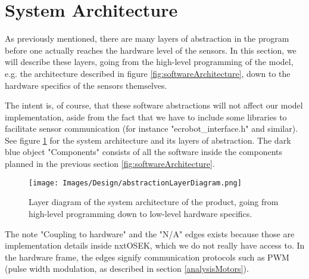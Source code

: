 \section{System Architecture}


As previously mentioned, there are many layers of abstraction in the program before one actually reaches the hardware level of the sensors. In this section, we will describe these layers, going from the high-level programming of the model, e.g. the architecture described in figure \ref{fig:softwareArchitecture}, down to the hardware specifics of the sensors themselves. 

The intent is, of course, that these software abstractions will not affect our model implementation, aside from the fact that we have to include some libraries to facilitate sensor communication (for instance "ecrobot\_interface.h" and similar). See figure \ref{fig:abstractionLayers} for the system architecture and its layers of abstraction. The dark blue object "Components" consists of all the software inside the components planned in the previous section \ref{fig:softwareArchitecture}. 

\begin{figure}[H]
    \texttt{[image: Images/Design/abstractionLayerDiagram.png]}
    \caption{Layer diagram of the system architecture of the product, going from high-level programming down to low-level hardware specifics.
    }
    \label{fig:abstractionLayers}
\end{figure}

The note "Coupling to hardware" and the "N/A" edges exists because those are implementation details inside nxtOSEK, which we do not really have access to. In the hardware frame, the edges signify communication protocols such as PWM (pulse width modulation, as described in section \ref{analysisMotors}). 
